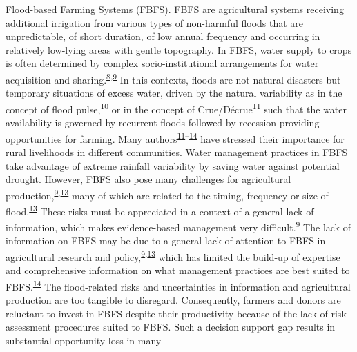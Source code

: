 \documentclass[11pt,preprint]{article}
\begin{document}
Flood-based Farming Systems (FBFS). FBFS are agricultural systems
receiving additional irrigation from various types of non-harmful floods
that are unpredictable, of short duration, of low annual frequency and
occurring in relatively low-lying areas with gentle topography. In FBFS,
water supply to crops is often determined by complex socio-institutional
arrangements for water acquisition and
sharing.\textsuperscript{\protect\hyperlink{ref-Haile_2010}{8},\protect\hyperlink{ref-VanSteenbergen_et_al_2010}{9}}
In this contexts, floods are not natural disasters but temporary
situations of excess water, driven by the natural variability as in the
concept of flood
pulse,\textsuperscript{\protect\hyperlink{ref-Junk_et_al_1989}{10}} or
in the concept of
Crue/Décrue\textsuperscript{\protect\hyperlink{ref-Harlan_Pasquereau_1969}{11}}
such that the water availability is governed by recurrent floods
followed by recession providing opportunities for farming. Many
authors\textsuperscript{\protect\hyperlink{ref-Harlan_Pasquereau_1969}{11}--\protect\hyperlink{ref-VanSteenbergen_et_al_2011}{14}}
have stressed their importance for rural livelihoods in different
communities. Water management practices in FBFS take advantage of
extreme rainfall variability by saving water against potential drought.
However, FBFS also pose many challenges for agricultural
production,\textsuperscript{\protect\hyperlink{ref-VanSteenbergen_et_al_2010}{9},\protect\hyperlink{ref-Puertas_et_al_2011}{13}}
many of which are related to the timing, frequency or size of
flood.\textsuperscript{\protect\hyperlink{ref-Puertas_et_al_2011}{13}}
These risks must be appreciated in a context of a general lack of
information, which makes evidence-based management very
difficult.\textsuperscript{\protect\hyperlink{ref-VanSteenbergen_et_al_2010}{9}}
The lack of information on FBFS may be due to a general lack of
attention to FBFS in agricultural research and
policy,\textsuperscript{\protect\hyperlink{ref-VanSteenbergen_et_al_2010}{9},\protect\hyperlink{ref-Puertas_et_al_2011}{13}}
which has limited the build-up of expertise and comprehensive
information on what management practices are best suited to
FBFS.\textsuperscript{\protect\hyperlink{ref-VanSteenbergen_et_al_2011}{14}}
The flood-related risks and uncertainties in information and
agricultural production are too tangible to disregard. Consequently,
farmers and donors are reluctant to invest in FBFS despite their
productivity because of the lack of risk assessment procedures suited to
FBFS. Such a decision support gap results in substantial opportunity
loss in many
\end{document}
